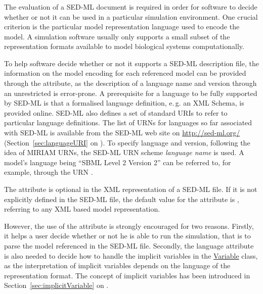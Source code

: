 \subsubsection{}
\label{sec:language}
The evaluation of a SED-ML document is required in order for software to decide whether or not it can be used in a particular simulation environment. One crucial criterion is the particular model representation language used to encode the model. A simulation software usually only supports a small subset of the representation formats available to model biological systems computationally. 

To help  software decide whether or not it supports a SED-ML description file, the information on the model encoding for each referenced model can be provided through the  attribute, as the description of a language name and version through an unrestricted  is error-prone. 
A prerequisite for a language to be fully supported by SED-ML is that a formalised language definition, e.\,g. an XML Schema, is provided online. SED-ML also defines a set of standard URIs to refer to particular language definitions. 
The list of URNs for languages so far associated with SED-ML is available from the SED-ML web site on \url{http://sed-ml.org/}  (Section~\ref{sec:languageURI} on ). 
To specify language and version, following the idea of MIRIAM URNs, the SED-ML URN scheme \emph{language name} is used. A model's language being ``SBML Level 2 Version 2'' can be referred to, for example, through the URN .

The  attribute is optional in the XML representation of a SED-ML file. 
If it is not explicitly defined in the SED-ML file, the default value for the  attribute is , referring to any XML based model representation. 

However, the use of the  attribute is strongly encouraged for two reasons. 
Firstly, it helps a user decide whether or not he is able to run the simulation, that is to parse the model referenced in the SED-ML file. 
Secondly, the language attribute is also needed to decide how to handle the implicit variables in the \hyperref[class:variable]{Variable} class, as the interpretation of implicit variables depends on the language of the representation format. The concept of implicit variables has been introduced in Section~\ref{sec:implicitVariable} on .




